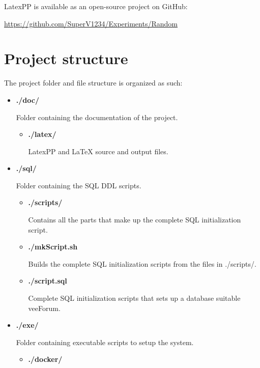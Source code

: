 \documentclass[12pt]{report}
\renewcommand\emph{\textbf}
\begin{document}
                    LatexPP is available as an open-source project on GitHub:

                    \url{https://github.com/SuperV1234/Experiments/Random}


        \chapter{Project structure}
            The project folder and file structure is organized as such:

            \begin{itemize}
                \item \emph{./doc/}

                    Folder containing the documentation of the project.
                    \begin{itemize}
                        \item \emph{./latex/}

                        LatexPP and \LaTeX{}  source and output files.
                    \end{itemize}

                \item \emph{./sql/}

                    Folder containing the SQL DDL scripts.
                    \begin{itemize}
                        \item \emph{./scripts/}

                        Contains all the parts that make up the complete SQL initialization script.

                        \item \emph{./mkScript.sh}

                        Builds the complete SQL initialization scripts from the files in ./scripts/.

                        \item \emph{./script.sql}

                        Complete SQL initialization scripts that sets up a database suitable veeForum.
                    \end{itemize}

                \item \emph{./exe/}

                    Folder containing executable scripts to setup the system.
                    \begin{itemize}
                        \item \emph{./docker/}


\end{itemize}
\end{itemize}
\end{document}
